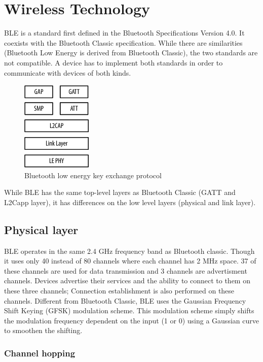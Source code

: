 \documentclass[conference]{IEEEtran}
\begin{document}
\section{Wireless Technology}

BLE is a standard first defined in the Bluetooth Specifications Version 4.0. It coexists with the Bluetooth Classic specification. While there are similarities (Bluetooth Low Energy is derived from Bluetooth Classic), the two standards are not compatible. A device has to implement both standards in order to communicate with devices of both kinds.

\begin{figure}
  \centering
    \includegraphics[width=0.3\textwidth]{layers}
    \caption{Bluetooth low energy key exchange protocol}
  \label{fig:layers}
\end{figure}


While BLE has the same top-level layers as Bluetooth Classic (GATT and L2Capp layer), it has differences on the low level layers (physical and link layer).

\subsection{Physical layer} \label{ssec:phy}

BLE operates in the same 2.4 GHz frequency band as Bluetooth classic. Though it uses only 40 instead of 80 channels where each channel has 2 MHz space. 37 of these channels are used for data transmission and 3 channels are advertisment channels. Devices advertise their services and the ability to connect to them on these three channels; Connection establishment is also performed on these channels. Different from Bluetooth Classic, BLE uses the Gaussian Frequency Shift Keying (GFSK) modulation scheme. This modulation scheme simply shifts the modulation frequency dependent on the input (1 or 0) using a Gaussian curve to smoothen the shifting.

\subsubsection{Channel hopping}
\end{document}
